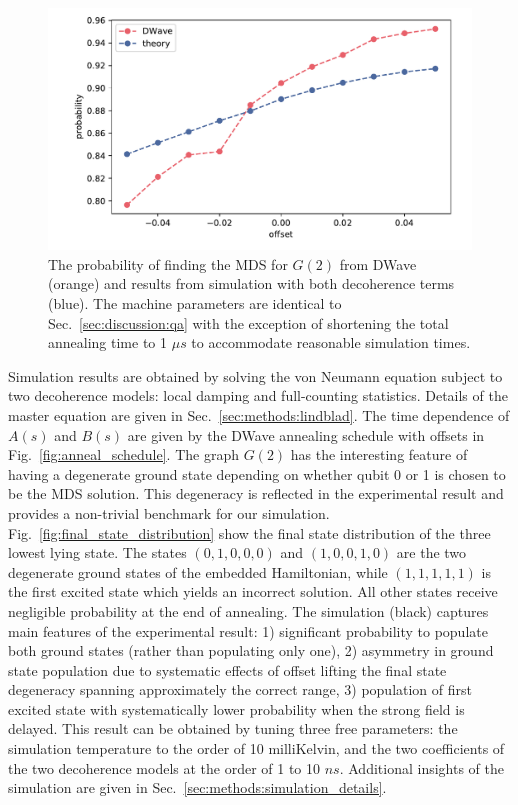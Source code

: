 \documentclass[prd,twocolumn,tightenlines,preprintnumbers,showpacs,superscriptaddress,notitlepage,nofootinbib,eqsecnum,floatfix,longbibliography,aps,10pt]{revtex4-2}
\begin{document}
\begin{figure}
	\centering
	\includegraphics[width=\columnwidth]{./new_figures/NN2_offset_scaling.pdf}
	\caption{The probability of finding the MDS for $G(2)$ from DWave (orange) and results from simulation with both decoherence terms (blue).
     The machine parameters are identical to Sec.~\ref{sec:discussion:qa} with the exception of shortening the total annealing time to 1 $\mu s$ to accommodate reasonable simulation times.}
	\label{fig:dwave1us}
\end{figure}

Simulation results are obtained by solving the von Neumann equation subject to two decoherence models: local damping and full-counting statistics.
Details of the master equation are given in Sec.~\ref{sec:methods:lindblad}. The time dependence of $A(s)$ and $B(s)$ are given by the DWave annealing schedule with offsets in Fig.~\ref{fig:anneal_schedule}.
The graph $G(2)$ has the interesting feature of having a degenerate ground state depending on whether qubit 0 or 1 is chosen to be the MDS solution.
This degeneracy is reflected in the experimental result and provides a non-trivial benchmark for our simulation.
Fig.~\ref{fig:final_state_distribution} show the final state distribution of the three lowest lying state.
The states $(0, 1, 0, 0, 0)$ and $(1, 0, 0, 1, 0)$ are the two degenerate ground states of the embedded Hamiltonian, while $(1, 1, 1, 1, 1)$ is the first excited state which yields an incorrect solution.
All other states receive negligible probability at the end of annealing.
The simulation (black) captures main features of the experimental result: 1) significant probability to populate both ground states (rather than populating only one), 2) asymmetry in ground state population due to systematic effects of offset lifting the final state degeneracy spanning approximately the correct range, 3) population of first excited state with systematically lower probability when the strong field is delayed.
This result can be obtained by tuning three free parameters: the simulation temperature to the order of 10 milliKelvin, and the two coefficients of the two decoherence models at the order of 1 to 10 $ns$.
Additional insights of the simulation are given in Sec.~\ref{sec:methods:simulation_details}.
\end{document}
